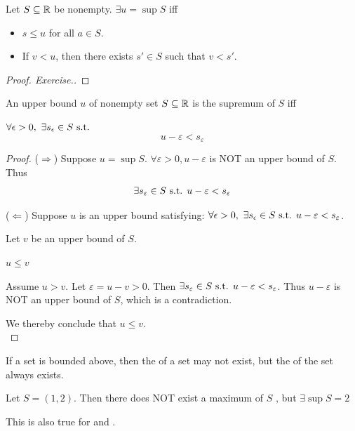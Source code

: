 \documentclass[a4paper,12pt]{article}
\begin{document}
\newpage

\begin{lemma}
    Let \(S\subseteq\mathbb{R}\) be nonempty. \(\exists u=\sup S\) iff 
    \begin{itemize}
        \item \(s\le u\) for all \(a\in S\).
        \item If \(v<u\), then there exists \(s'\in S\) such that \(v<s'\).
    \end{itemize}
    \begin{proof}[Proof. Exercise.]
        
    \end{proof}
\end{lemma}

\begin{lemma}
    An upper bound \(u\) of nonempty set \(S\subseteq\mathbb{R}\) is the supremum of \(S\) iff 
    
    \(\forall \epsilon>0,\ \exists s_\epsilon\in S\text{ s.t. }\)
    \[u-\varepsilon<s_\varepsilon\]
    \begin{proof}
        (\(\Rightarrow\)) Suppose \(u=\sup S\). \(\forall \varepsilon>0, u-\varepsilon\) is NOT an upper bound of \(S\). Thus 
        \[\exists s_\varepsilon\in S\text{ s.t. } u-\varepsilon<s_\varepsilon\]

        (\(\Leftarrow\)) Suppose \(u\) is an upper bound satisfying: \(\forall \epsilon>0,\ \exists s_\epsilon\in S\text{ s.t. } u-\varepsilon<s_\varepsilon\). 
        
        Let \(v\) be an upper bound of \(S\).

         \(u\le v\)

        Assume \(u>v\). Let \(\varepsilon=u-v>0\). Then \(\exists s_\varepsilon\in S\text{ s.t. } u-\varepsilon<s_\varepsilon\).
        Thus \(u-\varepsilon\) is NOT an upper bound of \(S\), which is a contradiction.

        We thereby conclude that \(u\le v\).\\
    \end{proof}
\end{lemma}

\begin{remark}
    If a set is bounded above, then the  of a set may not exist, but the  of the set always exists.\\   
    \begin{example}
        Let \(S=(1,2)\). Then there does NOT exist a maximum of \(S\) , but \(\exists\sup S=2\)
    \end{example}

    This is also true for  and .\\
\end{remark}
\end{document}
